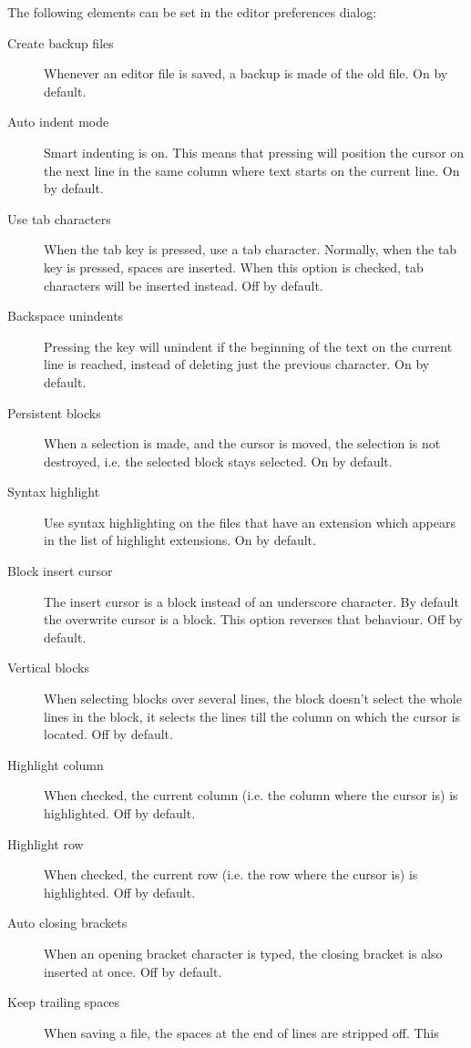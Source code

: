 
The following elements can be set in the editor preferences dialog:
\begin{description}
\item[Create backup files]
Whenever an editor file is saved, a backup is made of the old file. On by
default.
\item[Auto indent mode] 
Smart indenting is on. This means that pressing  will position the 
cursor on the next line in the same column where text starts on the current
line. On by default.
\item[Use tab characters] 
When the tab key is pressed, use a tab character. Normally, when the tab key
is pressed, spaces are inserted. When this option is checked, tab characters 
will be inserted instead. Off by default.
\item[Backspace unindents]
Pressing the  key will unindent if the beginning of the text on
the current line is reached, instead of deleting just the previous
character. On by default.
\item[Persistent blocks]
When a selection is made, and the cursor is moved, the selection is not
destroyed, i.e. the selected block stays selected. On by default. 
\item[Syntax highlight]
Use syntax highlighting on the files that have an extension which appears in
the list of highlight extensions. On by default.
\item[Block insert cursor]
The insert cursor is a block instead of an underscore character. By default
the overwrite cursor is a block. This option reverses that behaviour. Off by
default.
\item[Vertical blocks]
When selecting blocks over several lines, the block doesn't select the whole
lines in the block, it selects the lines till the column on which the cursor
is located. Off by default.
\item[Highlight column]
When checked, the current column (i.e. the column where the cursor is) is
highlighted. Off by default.
\item[Highlight row]
When checked, the current row (i.e. the row where the cursor is) is
highlighted. Off by default.
\item[Auto closing brackets]
When an opening bracket character is typed, the closing bracket is also
inserted at once. Off by default.
\item[Keep trailing spaces]
When saving a file, the spaces at the end of lines are stripped off. This

\end{description}
